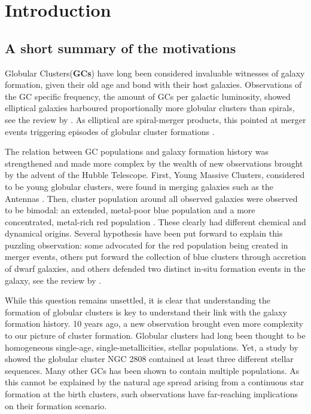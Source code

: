 



\chapter{Introduction}

\newpage


\section{A short summary of the motivations}


Globular Clusters(\textbf{GCs}) have long been considered invaluable witnesses of galaxy formation, given their old age and bond with their host galaxies. Observations of the GC specific frequency, the amount of GCs per galactic luminosity, showed elliptical galaxies harboured proportionally more globular clusters than spirals, see the review by \cite{Harris1991}. As elliptical are spiral-merger products, this pointed at merger events triggering episodes of globular cluster formations \citep{Ashman1992}.

The relation between GC populations and galaxy formation history was strengthened and made more complex by the wealth of new observations brought by the advent of the Hubble Telescope. First, Young Massive Clusters, considered to be young globular clusters, were found in merging galaxies such as the Antennas \citep{Whitmore1995}. Then, cluster population around all observed galaxies were observed to be bimodal: an extended, metal-poor blue population and a more concentrated, metal-rich red population \citep{Zepf1993,Geisler1996}. These clearly had different chemical and dynamical origins. Several hypothesis have been put forward to explain this puzzling observation: some advocated for the red population being created in merger events, others put forward the collection of blue clusters through accretion of dwarf galaxies, and others defended two distinct in-situ formation events in the galaxy, see the review by \cite{Brodie2006}.

While this question remains unsettled, it is clear that understanding the formation of globular clusters is key to understand their link with the galaxy formation history. 10 years ago, a new observation brought even more complexity to our picture of cluster formation. Globular clusters had long been thought to be homogeneous single-age, single-metallicities, stellar populations. Yet, a study by \cite{Piotto2007} showed the globular cluster NGC 2808 contained at least three different stellar sequences. Many other GCs has been shown to contain multiple populations. As this cannot be explained by the natural age spread arising from a continuous star formation at the birth clusters, such observations have far-reaching implications on their formation scenario.

